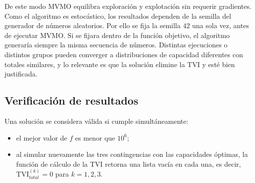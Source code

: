 De este modo MVMO equilibra exploración y explotación sin requerir gradientes. Como el algoritmo es estocástico, los resultados dependen de la semilla del generador de números aleatorios. Por ello se fija la semilla $42$ una sola vez, antes de ejecutar MVMO. Si se fijara dentro de la función objetivo, el algoritmo generaría siempre la misma secuencia de números. Distintas ejecuciones o distintos grupos pueden converger a distribuciones de capacidad diferentes con totales similares, y lo relevante es que la solución elimine la TVI y esté bien justificada.

\subsection{Verificación de resultados}

Una solución se considera válida si cumple simultáneamente:

\begin{itemize}
    \item el mejor valor de $f$ es menor que $10^6$;
    \item al simular nuevamente las tres contingencias con las capacidades óptimas, la función de cálculo de la TVI retorna una lista vacía en cada una, es decir, $\mathrm{TVI}_{total}^{(k)} = 0$ para $k = 1, 2, 3$.
\end{itemize}
